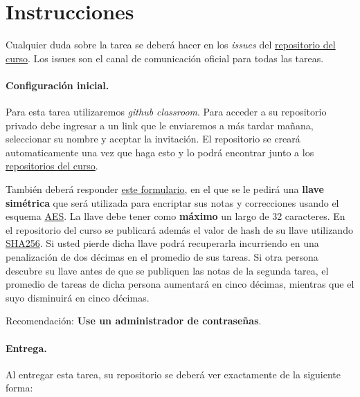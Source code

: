 
\section*{Instrucciones}

Cualquier duda sobre la tarea se deberá hacer en los \emph{issues} del \href{https://github.com/IIC3253/2025}{repositorio del curso}. Los issues son el canal de comunicación oficial para todas las tareas.

\paragraph{Configuración inicial.} 
Para esta tarea utilizaremos \textit{github classroom}. 
Para acceder a su repositorio privado debe ingresar a un link que le enviaremos a más tardar mañana, seleccionar su nombre y aceptar la invitación.
El repositorio se creará automaticamente una vez que haga esto y lo podrá encontrar junto a los \href{https://github.com/orgs/IIC3253/repositories}{repositorios del curso}.

\bigskip

También deberá responder \href{https://docs.google.com/forms/d/e/1FAIpQLSfw9jbIkJt0bVT9Sz0m2lQi8AwtrWeJ8s68p8Cs0reU8h1dGQ/viewform?usp=dialog}{este formulario}, en el que se le pedirá una \textbf{llave simétrica} que será utilizada para encriptar sus notas y correcciones usando el esquema \href{https://en.wikipedia.org/wiki/Advanced_Encryption_Standard}{AES}.
La llave debe tener como \textbf{máximo} un largo de 32 caracteres. En el repositorio del curso se publicará además el valor de hash de su llave utilizando \href{https://en.wikipedia.org/wiki/SHA-2}{SHA256}. Si usted pierde dicha llave podrá recuperarla incurriendo en una penalización de dos décimas en el promedio de sus tareas. Si otra persona descubre su llave antes de que se publiquen las notas de la segunda tarea, el promedio de tareas de dicha persona aumentará en cinco décimas, mientras que el suyo disminuirá en cinco décimas. 

Recomendación: \textbf{Use un administrador de contraseñas}.

\paragraph{Entrega.} Al entregar esta tarea, su repositorio se deberá ver exactamente de la siguiente forma:

\bigskip

